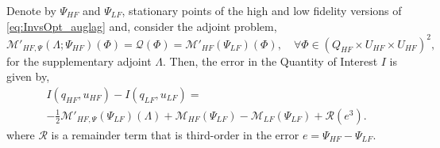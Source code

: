 \begin{theorem}
Denote by $\Psi_{HF}$ and $\Psi_{LF}$, stationary points of the high and low fidelity versions of \cref{eq:InvsOpt_auglag} and, consider the adjoint problem,
%
\begin{equation}
\label{eq:superAdjEq}
\mathcal{M}'_{HF,\Psi}(\Lambda;\Psi_{HF})(\Phi)=\mathcal{Q}(\Phi)=\mathcal M'_{HF}(\Psi_{LF})(\Phi),\quad\forall\Phi\in(Q_{HF}\times U_{HF}\times U_{HF})^2,
\end{equation}
%
for the supplementary adjoint $\Lambda$. Then, the error in the Quantity of Interest $I$ is given by,
%
\begin{multline}
\label{eq:finErrExp}
I(q_{HF},u_{HF})-I(q_{LF},u_{LF})=\\-\frac{1}{2}\mathcal{M}'_{HF,\Psi}(\Psi_{LF})(\Lambda)+\mathcal M_{HF}(\Psi_{LF})-\mathcal M_{LF}(\Psi_{LF})+\mathcal{R}(e^3).
\end{multline}
%
where $\mathcal{R}$ is a remainder term that is third-order in the error $e=\Psi_{HF}-\Psi_{LF}$.
\end{theorem}
%
